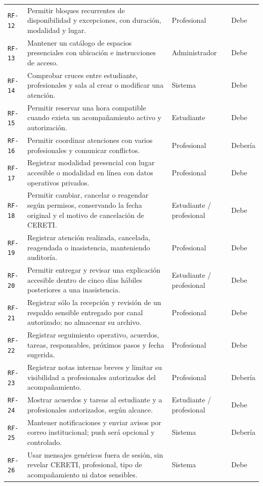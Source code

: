 \documentclass[10pt,a4paper,oneside]{article}
\newcommand{\id}[1]{\texttt{#1}}
\begin{document}
\begin{longtable}{@{}L{0.065\textwidth}L{0.60\textwidth}L{0.15\textwidth}L{0.14\textwidth}@{}}
\id{RF-12} & Permitir bloques recurrentes de disponibilidad y excepciones, con duración, modalidad y lugar. & Profesional & Debe\\
\id{RF-13} & Mantener un catálogo de espacios presenciales con ubicación e instrucciones de acceso. & Administrador & Debe\\
\id{RF-14} & Comprobar cruces entre estudiante, profesionales y sala al crear o modificar una atención. & Sistema & Debe\\
\id{RF-15} & Permitir reservar una hora compatible cuando exista un acompañamiento activo y autorización. & Estudiante & Debe\\
\id{RF-16} & Permitir coordinar atenciones con varios profesionales y comunicar conflictos. & Profesional & Debería\\
\id{RF-17} & Registrar modalidad presencial con lugar accesible o modalidad en línea con datos operativos privados. & Profesional & Debe\\
\id{RF-18} & Permitir cambiar, cancelar o reagendar según permisos, conservando la fecha original y el motivo de cancelación de CERETI. & Estudiante / profesional & Debe\\
\id{RF-19} & Registrar atención realizada, cancelada, reagendada o inasistencia, manteniendo auditoría. & Profesional & Debe\\
\id{RF-20} & Permitir entregar y revisar una explicación accesible dentro de cinco días hábiles posteriores a una inasistencia. & Estudiante / profesional & Debe\\
\id{RF-21} & Registrar sólo la recepción y revisión de un respaldo sensible entregado por canal autorizado; no almacenar su archivo. & Profesional & Debe\\
\id{RF-22} & Registrar seguimiento operativo, acuerdos, tareas, responsables, próximos pasos y fecha sugerida. & Profesional & Debe\\
\id{RF-23} & Registrar notas internas breves y limitar su visibilidad a profesionales autorizados del acompañamiento. & Profesional & Debería\\
\id{RF-24} & Mostrar acuerdos y tareas al estudiante y a profesionales autorizados, según alcance. & Estudiante / profesional & Debe\\
\id{RF-25} & Mantener notificaciones y enviar avisos por correo institucional; push será opcional y controlado. & Sistema & Debería\\
\id{RF-26} & Usar mensajes genéricos fuera de sesión, sin revelar CERETI, profesional, tipo de acompañamiento ni datos sensibles. & Sistema & Debe\\

\end{longtable}
\end{document}
